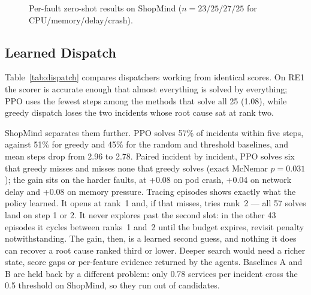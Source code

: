 \documentclass[conference,a4paper]{IEEEtran}
\begin{document}
\begin{figure}[t]
\centering
{}
\caption{Per-fault zero-shot results on ShopMind ($n=23/25/27/25$ for CPU/memory/delay/crash).}
\label{fig:perfault}
\end{figure}

\subsection{Learned Dispatch}
Table~\ref{tab:dispatch} compares dispatchers working from identical scores. On RE1 the scorer is accurate enough that almost everything is solved by everything; PPO uses the fewest steps among the methods that solve all 25 (1.08), while greedy dispatch loses the two incidents whose root cause sat at rank two.

ShopMind separates them further. PPO solves 57\% of incidents within five steps, against 51\% for greedy and 45\% for the random and threshold baselines, and mean steps drop from 2.96 to 2.78. Paired incident by incident, PPO solves six that greedy misses and misses none that greedy solves (exact McNemar $p=0.031$); the gain sits on the harder faults, at +0.08 on pod crash, +0.04 on network delay and +0.08 on memory pressure. Tracing episodes shows exactly what the policy learned. It opens at rank~1 and, if that misses, tries rank~2 --- all 57 solves land on step 1 or 2. It never explores past the second slot: in the other 43 episodes it cycles between ranks~1 and~2 until the budget expires, revisit penalty notwithstanding. The gain, then, is a learned second guess, and nothing it does can recover a root cause ranked third or lower. Deeper search would need a richer state, score gaps or per-feature evidence returned by the agents. Baselines A and B are held back by a different problem: only 0.78 services per incident cross the 0.5 threshold on ShopMind, so they run out of candidates.
\end{document}
